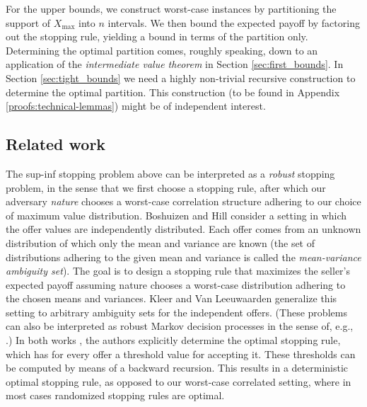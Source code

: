 \documentclass[11pt,a4paper]{article}
\numberwithin{equation}{section}
\begin{document}
{
For the upper bounds, we construct worst-case instances by partitioning the support of $X_{\max}$ into $n$ intervals.
We then bound the expected payoff by factoring out the stopping rule, yielding a bound in terms of the partition only. Determining the optimal partition comes, roughly speaking, down to an application of the \textit{intermediate value theorem} in Section \ref{sec:first_bounds}. In Section \ref{sec:tight_bounds} we need a highly non-trivial recursive construction to determine the optimal partition. This construction (to be found in Appendix \ref{proofs:technical-lemmas}) might be of independent interest.
}

\subsection{Related work}
\label{sec:rel_work}
{The sup-inf stopping problem above can be interpreted as a \textit{robust} stopping problem, in the sense that we first choose a stopping rule, after which our adversary \textit{nature} chooses a worst-case correlation structure adhering to our choice of maximum value distribution. Boshuizen and Hill \cite{boshuizen1992moment} consider a setting in which the offer values are independently distributed. Each offer comes from an unknown distribution of which only the mean and variance are known (the set of distributions adhering to the given mean and variance is called the \textit{mean-variance ambiguity set}). The goal is to design a stopping rule that maximizes the seller's expected payoff assuming nature chooses a worst-case distribution adhering to the chosen means and variances. Kleer and Van Leeuwaarden \cite{kleer2022optimalstoppingtheorydistributionally} generalize this setting to arbitrary ambiguity sets for the independent offers. (These problems can also be interpreted as robust Markov decision processes in the sense of, e.g., \cite{iyengar2005robust}.) In both works \cite{boshuizen1992moment,kleer2022optimalstoppingtheorydistributionally}, the authors explicitly determine the optimal stopping rule, which has for every offer a threshold value for accepting it. These thresholds can be computed by means of a backward recursion. This results in a deterministic optimal stopping rule, as opposed to our worst-case correlated setting, where in most cases randomized stopping rules are optimal.}
\end{document}
